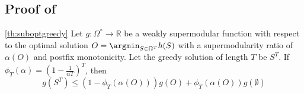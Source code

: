 \documentclass{article}
\begin{document}
\subsection{Proof of } \label{sec:proofsuboptgreedy}



\begin{customtheorem}{\ref{th:suboptgreedy}}
    Let $g: \Omega^* \to \mathbb{R}$ be a weakly supermodular function with respect to the optimal solution $O = \argmin_{S \in \Omega^T} h(S)$ with a supermodularity ratio of $\alpha(O)$ and 
    postfix monotonicity. Let the greedy solution of length $T$ be $S^T$. If $\phi_T(\alpha) =  \left(1 - \frac{1}{\alpha T}\right)^T$, then
    \begin{equation*}
        g(S^T) \leq  \left(1 - \phi_T(\alpha(O))\right)
        g(O) +  \phi_T(\alpha(O))g(\emptyset)
    \end{equation*}
\end{customtheorem}
\end{document}
